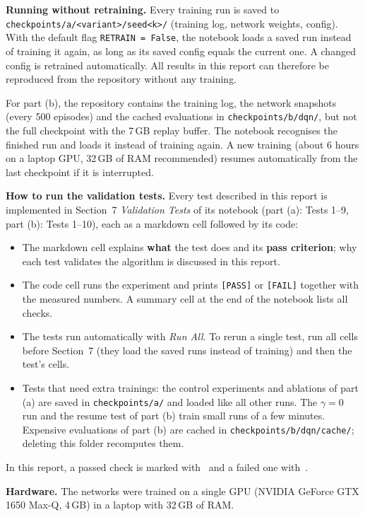 \begin{sloppypar}
\textbf{Running without retraining.} Every training run is saved to \texttt{checkpoints/a/<variant>/seed<k>/} (training log, network weights, config). With the default flag \texttt{RETRAIN = False}, the notebook loads a saved run instead of training it again, as long as its saved config equals the current one. A changed config is retrained automatically. All results in this report can therefore be reproduced from the repository without any training.

For part (b), the repository contains the training log, the network snapshots (every 500 episodes) and the cached evaluations in \texttt{checkpoints/b/dqn/}, but not the full checkpoint with the 7\,GB replay buffer. The notebook recognises the finished run and loads it instead of training again. A new training (about 6 hours on a laptop GPU, 32\,GB of RAM recommended) resumes automatically from the last checkpoint if it is interrupted.
\end{sloppypar}

\begin{notebox}
\textbf{How to run the validation tests.} Every test described in this report is implemented in Section~7 \emph{Validation Tests} of its notebook (part (a): Tests 1--9, part (b): Tests 1--10), each as a markdown cell followed by its code:
\begin{itemize}
  \item The markdown cell explains \textbf{what} the test does and its \textbf{pass criterion}; why each test validates the algorithm is discussed in this report.
  \item The code cell runs the experiment and prints \texttt{[PASS]} or \texttt{[FAIL]} together with the measured numbers. A summary cell at the end of the notebook lists all checks.
  \item The tests run automatically with \emph{Run All}. To rerun a single test, run all cells before Section~7 (they load the saved runs instead of training) and then the test's cells.
  \item Tests that need extra trainings: the control experiments and ablations of part (a) are saved in \texttt{checkpoints/a/} and loaded like all other runs. The $\gamma = 0$ run and the resume test of part (b) train small runs of a few minutes. Expensive evaluations of part (b) are cached in \texttt{checkpoints/b/dqn/cache/}; deleting this folder recomputes them.
\end{itemize}
In this report, a passed check is marked with~\pass{} and a failed one with~\fail.
\end{notebox}

\textbf{Hardware.} The networks were trained on a single GPU (NVIDIA GeForce GTX 1650 Max-Q, 4\,GB) in a laptop with 32\,GB of RAM.
